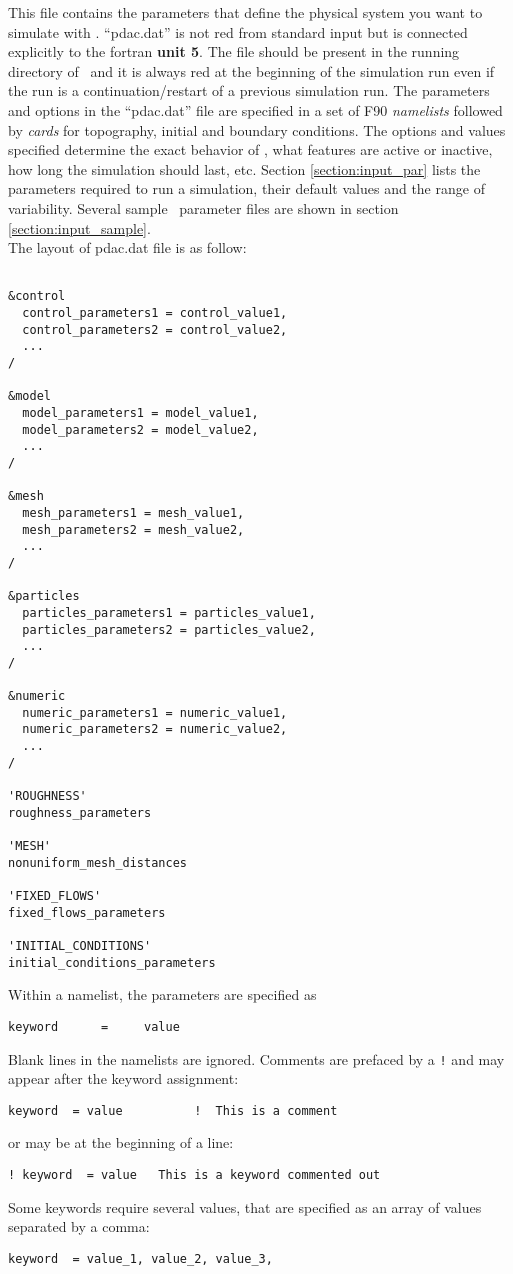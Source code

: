 This file contains the parameters that define the physical system
you want to simulate with \PDAC. ``pdac.dat'' is not red from standard 
input but is connected explicitly to the fortran {\bf unit 5}. The file should
be present in the running directory of \PDAC\, and it is always red
at the beginning of the simulation run even if the run is a 
continuation/restart of a previous simulation run. 
The parameters and options in the ``pdac.dat'' file are specified
in a set of F90 {\em namelists} followed by {\em cards} for topography, 
initial and boundary conditions.
The options and values specified determine the exact behavior of
\PDAC, what features are active or inactive, how long the simulation
should last, etc.  
Section \ref{section:input_par} lists the parameters required to run a 
simulation, their default values and the range of variability.
Several sample \PDAC\ parameter files are shown in section 
\ref{section:input_sample}.\\

The layout of pdac.dat file is as follow:

\begin{verbatim}

&control
  control_parameters1 = control_value1,
  control_parameters2 = control_value2,
  ...
/

&model
  model_parameters1 = model_value1,
  model_parameters2 = model_value2,
  ...
/

&mesh
  mesh_parameters1 = mesh_value1,
  mesh_parameters2 = mesh_value2,
  ...
/

&particles
  particles_parameters1 = particles_value1,
  particles_parameters2 = particles_value2,
  ...
/

&numeric
  numeric_parameters1 = numeric_value1,
  numeric_parameters2 = numeric_value2,
  ...
/

'ROUGHNESS'
roughness_parameters

'MESH'
nonuniform_mesh_distances

'FIXED_FLOWS'
fixed_flows_parameters

'INITIAL_CONDITIONS'
initial_conditions_parameters

\end{verbatim}

Within a namelist, the parameters are specified as
\begin{verbatim}
keyword      =     value
\end{verbatim}
Blank lines in the namelists are ignored.  Comments are prefaced by
a {\tt !} and may appear after the keyword assignment:
\begin{verbatim}
keyword  = value          !  This is a comment
\end{verbatim}
or may be at the beginning of a line:
\begin{verbatim}
! keyword  = value   This is a keyword commented out
\end{verbatim}
Some keywords require several values, that are specified as an array of values
separated by a comma:
\begin{verbatim}
keyword  = value_1, value_2, value_3,
\end{verbatim}

